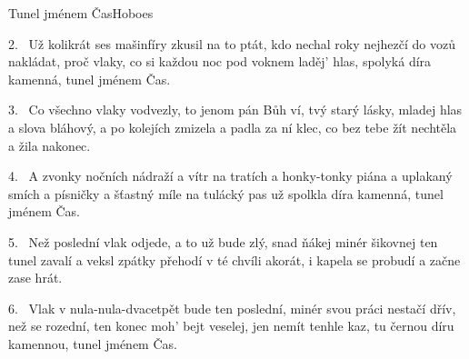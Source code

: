 \begin{song}{Tunel jménem Čas}{Hoboes}



\begin{xverse}{2.~}
Už kolikrát ses mašinfíry zkusil na to ptát,
kdo nechal roky nejhezčí do vozů nakládat,
proč vlaky, co si každou noc pod voknem laděj' hlas,
spolyká díra kamenná, tunel jménem Čas.
\end{xverse}


\begin{xverse}{3.~}
Co všechno vlaky vodvezly, to jenom pán Bůh ví,
tvý starý lásky, mladej hlas a slova bláhový,
a po kolejích zmizela a padla za ní klec,
co bez tebe žít nechtěla a žila nakonec.
\end{xverse}


\begin{xverse}{4.~}
A zvonky nočních nádraží a vítr na tratích
a honky-tonky piána a uplakaný smích
a písničky a šťastný míle na tulácký pas
už spolkla díra kamenná, tunel jménem Čas.
\end{xverse}


\begin{xverse}{5.~}
Než poslední vlak odjede, a to už bude zlý,
snad ňákej minér šikovnej ten tunel zavalí
a veksl zpátky přehodí v té chvíli akorát,
i kapela se probudí a začne zase hrát.
\end{xverse}


\begin{xverse}{6.~}
Vlak v nula-nula-dvacetpět bude ten poslední,
minér svou práci nestačí dřív, než se rozední,
ten konec moh' bejt veselej, jen nemít tenhle kaz,
tu černou díru kamennou, tunel jménem Čas.
\end{xverse}

\end{song}

